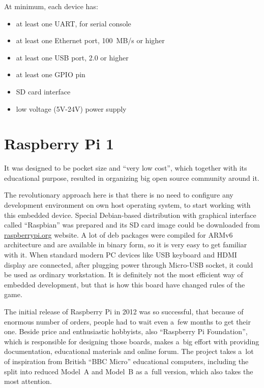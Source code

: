 \documentclass[printmode]{mgr}
\begin{document}
At minimum, each device has:
\begin{itemize}
  \itemsep0em
  \item at least one UART, for serial console
  \item at least one Ethernet port, 100~MB/s or higher
  \item at least one USB port, 2.0 or higher
  \item at least one GPIO pin
  \item SD card interface
  \item low voltage (5V-24V) power supply
\end{itemize}



\section{Raspberry Pi 1}


It was designed to be pocket size and ``very low cost''\cite{web:raspberrypi-lowcost}, which together with its educational purpose, resulted in organizing big open source community around it.

The revolutionary approach here is that there is no need to configure any development environment on own host operating system, to start working with this embedded device.
Special Debian-based distribution with graphical interface called ``Raspbian'' was prepared and its SD card image could be downloaded from \url{raspberrypi.org} website.
A lot of deb packages were compiled for ARMv6 architecture and are available in binary form, so it is very easy to get familiar with it.\cite{web:raspberrypi-raspbian}
When standard modern PC devices like USB keyboard and HDMI display are connected, after plugging power through Micro-USB socket, it could be used as ordinary workstation.
It is definitely not the most efficient way of embedded development, but that is how this board have changed rules of the game.

The initial release of Raspberry Pi in 2012 was so successful, that because of enormous number of orders, people had to wait even a~few months to get their one. 
Beside price and enthusiastic hobbyists, also ``Raspberry Pi Foundation'', which is responsible for designing those boards, makes a~big effort with providing documentation, educational materials and online forum.\cite{web:raspberrypi-forum}
The project takes a~lot of inspiration from British ``BBC Micro'' educational computers, including the split into reduced Model~A and Model~B as a~full version, which also takes the most attention.
\end{document}
